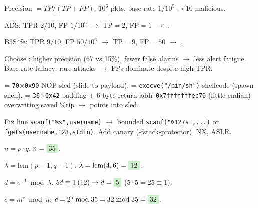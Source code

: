 {
Precision $= TP/(TP+FP)$. $10^6$ pkts, base rate $1/10^5 \to 10$ malicious.\par
{} ADS: TPR $2/10$, FP $1/10^6$ $\to$ TP$=2$, FP$=1$ $\to$ .\par
{} B3S4fe: TPR $9/10$, FP $50/10^6$ $\to$ TP$=9$, FP$=50$ $\to$ .\par
{} Choose : higher precision (67 vs 15\%), fewer false alarms $\to$ less alert fatigue. Base-rate fallacy: rare attacks $\to$ FPs dominate despite high TPR.\par

  = \texttt{70$\times$0x90} NOP sled (slide to payload).  = \texttt{execve("/bin/sh")} shellcode (spawn shell).  = \texttt{36$\times$0x42} padding + 6-byte return addr \texttt{0x7fffffffec70} (little-endian) overwriting saved \%rip $\to$ points into sled.\par
{} Fix line \texttt{scanf("\%s",username)} $\to$ bounded \texttt{scanf("\%127s",...)} or \texttt{fgets(username,128,stdin)}. Add canary (-fstack-protector), NX, ASLR.\par

 $n = p\cdot q$.  $n=\ans{35}$.\par
{} $\lambda = \mathrm{lcm}(p{-}1,q{-}1)$.  $\lambda=\mathrm{lcm}(4,6)=\ans{12}$.\par
{} $d = e^{-1}\bmod\lambda$.  $5d\equiv1\:(12)\to d=\ans{5}$ ($5{\cdot}5{=}25{\equiv}1$).\par
{} $c = m^e \bmod n$.  $c = 2^5\bmod35 = 32\bmod35 = \ans{32}$.\par
}
